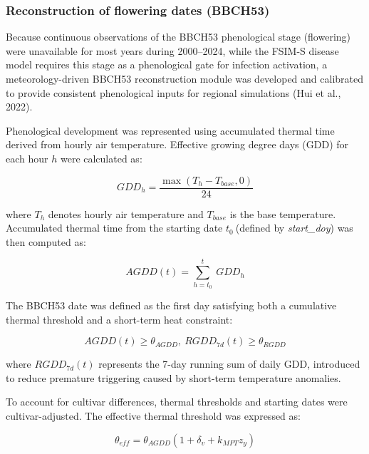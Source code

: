 \documentclass[
]{article}
\begin{document}
\subsubsection{Reconstruction of flowering dates
(BBCH53)}\label{reconstruction-of-flowering-dates-bbch53}

Because continuous observations of the BBCH53 phenological stage
(flowering) were unavailable for most years during 2000--2024, while the
FSIM-S disease model requires this stage as a phenological gate for
infection activation, a meteorology-driven BBCH53 reconstruction module
was developed and calibrated to provide consistent phenological inputs
for regional simulations (Hui et al., 2022).

Phenological development was represented using accumulated thermal time
derived from hourly air temperature. Effective growing degree days (GDD)
for each hour \(h\) were calculated as:

\begin{equation}
GDD_{h} = \frac{\max(T_{h} - T_{base},0)}{24}
\tag{14}
\end{equation}

where \(T_{h}\) denotes hourly air temperature and \(T_{base}\) is the
base temperature. Accumulated thermal time from the starting date
\(t_{0}\ \)(defined by \emph{start\_doy}) was then computed as:

\begin{equation}
AGDD(t) = \sum_{h = t_{0}}^{t}\mspace{2mu}\mspace{2mu} GDD_{h}
\tag{15}
\end{equation}

The BBCH53 date was defined as the first day satisfying both a
cumulative thermal threshold and a short-term heat constraint:

\begin{equation}
AGDD(t) \geq \theta_{AGDD},\ RGDD_{7d}(t) \geq \theta_{RGDD}
\tag{16}
\end{equation}

where \(RGDD_{7d}(t)\) represents the 7-day running sum of daily GDD,
introduced to reduce premature triggering caused by short-term
temperature anomalies.

To account for cultivar differences, thermal thresholds and starting
dates were cultivar-adjusted. The effective thermal threshold was
expressed as:

\begin{equation}
\theta_{eff} = \theta_{AGDD}(1 + \delta_{v} + k_{MPT}z_{y})
\tag{17}
\end{equation}
\end{document}
